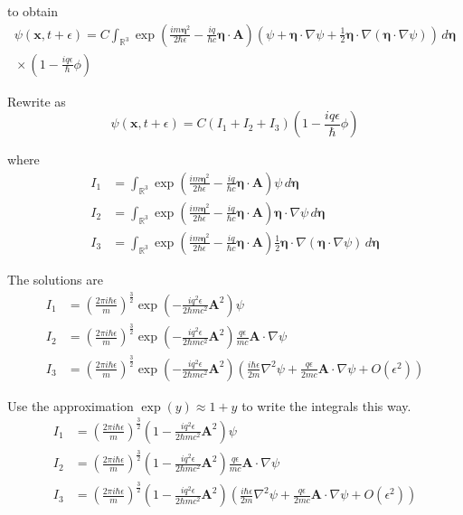 to obtain
\begin{multline*}
\psi(\mathbf x,t+\epsilon)
=C\int_{\mathbb R^3}
\exp\left(\frac{im\boldsymbol\eta^2}{2\hbar\epsilon}
-\frac{iq}{\hbar c}\boldsymbol\eta\cdot\mathbf A\right)
\left(
\psi
+\boldsymbol\eta\cdot\nabla\psi
+\frac{1}{2}\boldsymbol\eta\cdot\nabla(\boldsymbol\eta\cdot\nabla\psi)
\right)
\,d\boldsymbol\eta
\\
{}\times\left(1-\frac{iq\epsilon}{\hbar}\phi\right)
\end{multline*}

Rewrite as
\begin{equation*}
\psi(\mathbf x,t+\epsilon)
=C(I_1+I_2+I_3)\left(1-\frac{iq\epsilon}{\hbar}\phi\right)
\tag{1}
\end{equation*}

where
\begin{align*}
I_1&=\int_{\mathbb R^3}
\exp\left(\frac{im\boldsymbol\eta^2}{2\hbar\epsilon}
-\frac{iq}{\hbar c}\boldsymbol\eta\cdot\mathbf A\right)
\psi\,d\boldsymbol\eta
\\
I_2&=\int_{\mathbb R^3}
\exp\left(\frac{im\boldsymbol\eta^2}{2\hbar\epsilon}
-\frac{iq}{\hbar c}\boldsymbol\eta\cdot\mathbf A\right)
\boldsymbol\eta\cdot\nabla\psi
\,d\boldsymbol\eta
\\
I_3&=\int_{\mathbb R^3}
\exp\left(\frac{im\boldsymbol\eta^2}{2\hbar\epsilon}
-\frac{iq}{\hbar c}\boldsymbol\eta\cdot\mathbf A\right)
\frac{1}{2}\boldsymbol\eta\cdot\nabla(\boldsymbol\eta\cdot\nabla\psi)
\,d\boldsymbol\eta
\end{align*}

The solutions are
\begin{align*}
I_1&=\left(\frac{2\pi i\hbar\epsilon}{m}\right)^\frac{3}{2}
\exp\left(-\frac{iq^2\epsilon}{2\hbar mc^2}\mathbf A^2\right)\psi
\\
I_2&=\left(\frac{2\pi i\hbar\epsilon}{m}\right)^\frac{3}{2}
\exp\left(-\frac{iq^2\epsilon}{2\hbar mc^2}\mathbf A^2\right)
\frac{q\epsilon}{mc}
\mathbf A\cdot\nabla\psi
\\
I_3&=\left(\frac{2\pi i\hbar\epsilon}{m}\right)^\frac{3}{2}
\exp\left(-\frac{iq^2\epsilon}{2\hbar mc^2}\mathbf A^2\right)
\left(
\frac{i\hbar\epsilon}{2m}\nabla^2\psi
+\frac{q\epsilon}{2mc}\mathbf A\cdot\nabla\psi+O(\epsilon^2)
\right)
\end{align*}

Use the approximation $\exp(y)\approx1+y$ to write the integrals this way.
\begin{align*}
I_1&=\left(\frac{2\pi i\hbar\epsilon}{m}\right)^\frac{3}{2}
\left(1-\frac{iq^2\epsilon}{2\hbar mc^2}\mathbf A^2\right)\psi
\\
I_2&=\left(\frac{2\pi i\hbar\epsilon}{m}\right)^\frac{3}{2}
\left(1-\frac{iq^2\epsilon}{2\hbar mc^2}\mathbf A^2\right)
\frac{q\epsilon}{mc}
\mathbf A\cdot\nabla\psi
\\
I_3&=\left(\frac{2\pi i\hbar\epsilon}{m}\right)^\frac{3}{2}
\left(1-\frac{iq^2\epsilon}{2\hbar mc^2}\mathbf A^2\right)
\left(
\frac{i\hbar\epsilon}{2m}\nabla^2\psi
+\frac{q\epsilon}{2mc}\mathbf A\cdot\nabla\psi+O(\epsilon^2)
\right)
\end{align*}

